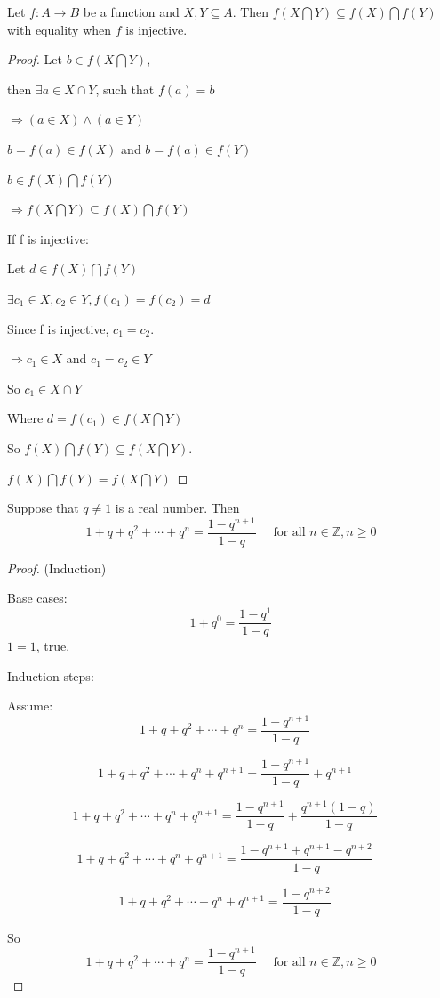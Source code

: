\documentclass[12pt]{article}
\begin{document}
\vfill
\begin{Lemma} Let $f : A \rightarrow B$ be a function and $X,Y \subseteq A$.
Then $f(X \bigcap Y) \subseteq f(X) \bigcap f(Y)$ with equality when $f$ is injective.
\end{Lemma}
\begin{proof}
Let $b \in f(X \bigcap Y)$, 

then $\exists a\in X \cap Y$, such that $f(a)=b$

$\Rightarrow (a \in X) \wedge (a\in Y)$

$b = f(a) \in f(X)$ and $b = f(a) \in f(Y)$

$b\in f(X) \bigcap f(Y)$

$\Rightarrow f(X \bigcap Y) \subseteq f(X) \bigcap f(Y)$

If f is injective: 

Let $d \in f(X) \bigcap f(Y)$

$\exists c_1 \in X, c_2 \in Y, f(c_1) = f(c_2) = d$

Since f is injective, $c_1 = c_2$.

$\Rightarrow c_1 \in X$ and $c_1 = c_2 \in Y$

So $c_1 \in X \cap Y$

Where $d = f(c_1) \in f(X \bigcap Y)$

So $f(X) \bigcap f(Y) \subseteq f(X \bigcap Y)$.

$f(X) \bigcap f(Y) = f(X \bigcap Y)$
\end{proof}
\vfill
\begin{Lemma}
Suppose that $q \neq 1$ is a real number. Then
$$
1+q+q^{2}+\cdots+q^{n}=\frac{1-q^{n+1}}{1-q} \quad \text { for all } n \in
\mathbb{Z}, n \geq 0
$$
\end{Lemma}
\begin{proof}
(Induction)

Base cases:
\[
1 + q^0 = \frac{1-q^{1}}{1-q}
\]
$1=1$, true.

Induction steps:

Assume: $$
1+q+q^{2}+\cdots+q^{n}=\frac{1-q^{n+1}}{1-q} \quad$$

$$
1+q+q^{2}+\cdots+q^{n} + q^{n+1}=\frac{1-q^{n+1}}{1-q} +q^{n+1}\quad$$

$$
1+q+q^{2}+\cdots+q^{n} + q^{n+1}=\frac{1-q^{n+1}}{1-q} +\frac{q^{n+1} (1-q)}{1-q}\quad$$

$$
1+q+q^{2}+\cdots+q^{n} + q^{n+1}=\frac{1-q^{n+1}+q^{n+1}-q^{n+2}}{1-q}\quad$$

$$
1+q+q^{2}+\cdots+q^{n} + q^{n+1}=\frac{1-q^{n+2}}{1-q}\quad$$

So $$
1+q+q^{2}+\cdots+q^{n}=\frac{1-q^{n+1}}{1-q} \quad \text { for all } n \in
\mathbb{Z}, n \geq 0
$$
\end{proof}
\end{document}
